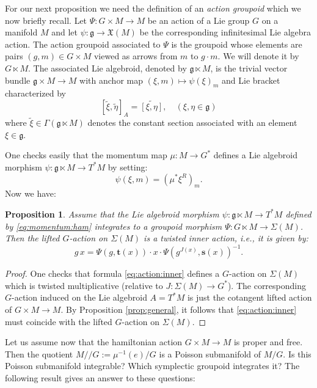 \documentclass[a4paper,11pt]{amsart}
\newtheorem{prop}[thm]{Proposition}
\theoremstyle{definition}
\theoremstyle{remark}
\begin{document}
For our next proposition we need the definition of an \emph{action groupoid} which we now briefly recall. Let
$\Psi:G\times M\to M$ be an action of a Lie group $G$ on a manifold $M$ and let $\psi:{\mathfrak{g}}\to{\ensuremath{\mathfrak{X}}}(M)$ be the
corresponding infinitesimal Lie algebra action. The action groupoid associated to $\Psi$ is the groupoid whose
elements are pairs $(g,m)\in G\times M$ viewed as arrows from $m$ to $g\cdot m$. We will denote it by $G\ltimes
M$. The associated Lie algebroid, denoted by ${\mathfrak{g}}\ltimes M$, is the trivial vector bundle ${\mathfrak{g}}\times M\to M$
with anchor map $(\xi,m)\mapsto \psi (\xi )_m$ and Lie bracket characterized by
\[ [\tilde{\xi},\tilde{\eta}]_A=\widetilde{[\xi ,\eta]},\quad (\xi,\eta\in{\mathfrak{g}})\]
where $\tilde{\xi}\in \Gamma({\mathfrak{g}}\ltimes M)$ denotes the constant section associated
with an element $\xi\in{\mathfrak{g}}$.

One checks easily that the momentum map $\mu:M\to G^*$ defines a Lie algebroid morphism
$\psi:{\mathfrak{g}}\ltimes M\to T^*M$ by setting:
\begin{equation}
\label{eq:momentum:ham} \psi(\xi,m) = (\mu^*\xi^R)_m.
\end{equation}
Now we have:

\begin{prop}
Assume that the Lie algebroid morphism $\psi:{\mathfrak{g}}\ltimes M\to T^*M$ defined by \eqref{eq:momentum:ham} integrates
to a groupoid morphism $\Psi:G\ltimes M\to \Sigma(M)$. Then the lifted $G$-action on $\Sigma(M)$ is a twisted
inner action, i.e., it is given by:
\begin{equation}
\label{eq:action:inner}
g\,x=\Psi(g,{\mathbf{t}}(x))\cdot x\cdot \Psi(g^{J(x)},{\mathbf{s}}(x))^{-1}.
\end{equation}
\end{prop}

\begin{proof}
One checks that formula \eqref{eq:action:inner} defines a
$G$-action on $\Sigma(M)$ which is twisted multiplicative (relative
to $J:\Sigma(M)\to G^*$). The corresponding
$G$-action induced on the Lie algebroid $A=T^*M$ is just the
cotangent lifted action of $G\times M\to M$. By Proposition
\ref{prop:general}, it follows that \eqref{eq:action:inner} must
coincide with the lifted $G$-action on $\Sigma(M)$.
\end{proof}

Let us assume now that the hamiltonian action $G\times M\to M$ is proper and free. Then the quotient
$M//G:=\mu^{-1}(e)/G$ is a Poisson submanifold of $M/G$. Is this Poisson submanifold integrable? Which
symplectic groupoid integrates it? The following result gives an answer to these questions:
\end{document}
